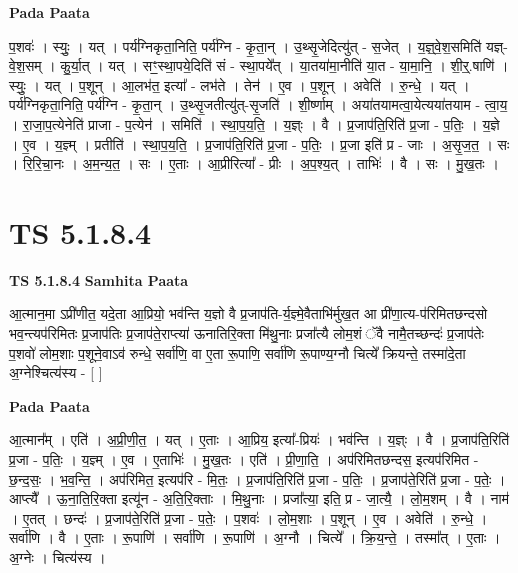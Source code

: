 \documentclass[17pt]{extarticle}
\begin{document}
\textbf{Pada Paata} \newline

प॒शवः॑ । स्युः॒ । यत् । पर्य॑ग्निकृता॒निति॒ पर्य॑ग्नि - कृ॒ता॒न् । उ॒थ्सृ॒जेदित्यु॑त् - स॒जेत् । य॒ज्ञ्॒वे॒श॒समिति॑ यज्ञ्-वे॒श॒सम् । कु॒र्या॒त् । यत् । सꣳ॒॒स्था॒पये॒दिति॑ सं - स्था॒पये᳚त् । या॒तया॑मा॒नीति॑ या॒त - या॒मा॒नि॒ । शी॒र्॒.षाणि॑ । स्युः॒ । यत् । प॒शून् । आ॒लभ॑त॒ इत्या᳚ - लभ॑ते । तेन॑ । ए॒व । प॒शून् । अवेति॑ । रु॒न्धे॒ । यत् । पर्य॑ग्निकृता॒निति॒ पर्य॑ग्नि - कृ॒ता॒न् । उ॒थ्सृ॒जतीत्यु॑त्-सृ॒जति॑ । शी॒र्ष्णाम् । अया॑तयामत्वा॒येत्यया॑तयाम - त्वा॒य॒ । रा॒जा॒प॒त्येनेति॑ प्राजा - प॒त्येन॑ । समिति॑ । स्था॒प॒य॒ति॒ । य॒ज्ञ्ः । वै । प्र॒जाप॑ति॒रिति॑ प्र॒जा - प॒तिः॒ । य॒ज्ञे । ए॒व । य॒ज्ञ्म् । प्रतीति॑ । स्था॒प॒य॒ति॒ । प्र॒जाप॑ति॒रिति॑ प्र॒जा - प॒तिः॒ । प्र॒जा इति॑ प्र - जाः । अ॒सृ॒ज॒त॒ । सः । रि॒रि॒चा॒नः । अ॒म॒न्य॒त॒ । सः । ए॒ताः । आ॒प्रीरित्या᳚ - प्रीः । अ॒प॒श्य॒त् । ताभिः॑ । वै । सः । मु॒ख॒तः ।  \newline




\section*{ TS 5.1.8.4 }

\textbf{TS 5.1.8.4 } \newline
\textbf{Samhita Paata} \newline

आ॒त्मान॒मा ऽप्री॑णीत॒ यदे॒ता आ॒प्रियो॒ भव॑न्ति य॒ज्ञो वै प्र॒जाप॑ति-र्य॒ज्ञ्मे॒वैताभि॑र्मुख॒त आ प्री॑णा॒त्य-प॑रिमितछन्दसो भव॒न्त्यप॑रिमितः प्र॒जाप॑तिः प्र॒जाप॑ते॒राप्त्या॑ ऊनातिरि॒क्ता मि॑थु॒नाः प्रजा᳚त्यै लोम॒शं ॅवै नामै॒तच्छन्दः॑ प्र॒जाप॑तेः प॒शवो॑ लोम॒शाः प॒शूने॒वाऽव॑ रुन्धे॒ सर्वा॑णि॒ वा ए॒ता रू॒पाणि॒ सर्वा॑णि रू॒पाण्य॒ग्नौ चित्ये᳚ क्रियन्ते॒ तस्मा॑दे॒ता अ॒ग्नेश्चित्य॑स्य - [  ] \newline

\textbf{Pada Paata} \newline

आ॒त्मान᳚म् । एति॑ । अ॒प्री॒णी॒त॒ । यत् । ए॒ताः । आ॒प्रिय॒ इत्या᳚-प्रियः॑ । भव॑न्ति । य॒ज्ञ्ः । वै । प्र॒जाप॑ति॒रिति॑ प्र॒जा - प॒तिः॒ । य॒ज्ञ्म् । ए॒व । ए॒ताभिः॑ । मु॒ख॒तः । एति॑ । प्री॒णा॒ति॒ । अप॑रिमितछन्दस॒ इत्यप॑रिमित - छ॒न्द॒सः॒ । भ॒व॒न्ति॒ । अप॑रिमित॒ इत्यप॑रि - मि॒तः॒ । प्र॒जाप॑ति॒रिति॑ प्र॒जा - प॒तिः॒ । प्र॒जाप॑ते॒रिति॑ प्र॒जा - प॒तेः॒ । आप्त्यै᳚ । ऊ॒ना॒ति॒रि॒क्ता इत्यू॑न - अ॒ति॒रि॒क्ताः । मि॒थु॒नाः । प्रजा᳚त्या॒ इति॒ प्र - जा॒त्यै॒ । लो॒म॒शम् । वै । नाम॑ । ए॒तत् । छन्दः॑ । प्र॒जाप॑ते॒रिति॑ प्र॒जा - प॒तेः॒ । प॒शवः॑ । लो॒म॒शाः । प॒शून् । ए॒व । अवेति॑ । रु॒न्धे॒ । सर्वा॑णि । वै । ए॒ताः । रू॒पाणि॑ । सर्वा॑णि । रू॒पाणि॑ । अ॒ग्नौ । चित्ये᳚ । क्रि॒य॒न्ते॒ । तस्मा᳚त् । ए॒ताः । अ॒ग्नेः । चित्य॑स्य ।  \newline
\end{document}
